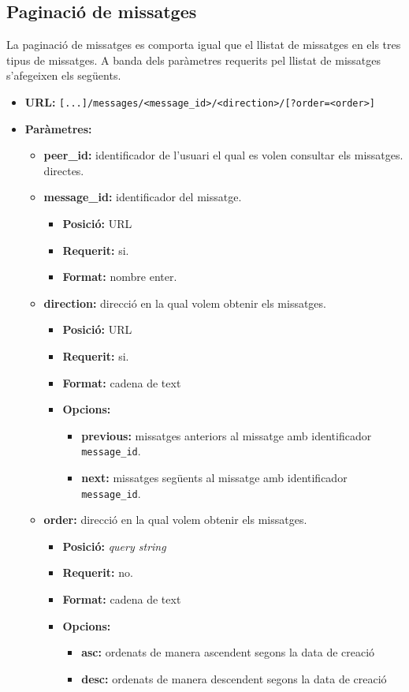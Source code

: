 	
\subsection{Paginació de missatges}
La paginació de missatges es comporta igual que el llistat de missatges en els tres tipus de missatges. A banda dels paràmetres requerits pel llistat de missatges s'afegeixen els següents.
\begin{itemize}
\item \textbf{\ac{URL}:} \verb$[...]/messages/<message_id>/<direction>/[?order=<order>]$
\item \textbf{Paràmetres:}
	\begin{itemize}
		\item \textbf{peer\_id:} identificador de l'usuari el qual es volen consultar els missatges. directes.
		\item \textbf{message\_id:} identificador del missatge.
		\begin{itemize}
			\item \textbf{Posició:} \ac{URL}
			\item \textbf{Requerit:} si.
			\item \textbf{Format:} nombre enter.
		\end{itemize}
		\item \textbf{direction:} direcció en la qual volem obtenir els missatges.
		\begin{itemize}
			\item \textbf{Posició:} \ac{URL}
			\item \textbf{Requerit:} si.
			\item \textbf{Format:} cadena de text
			\item \textbf{Opcions:}
				\begin{itemize}
					\item \textbf{previous:} missatges anteriors al missatge amb identificador \texttt{message\_id}.
					\item \textbf{next:} missatges següents al missatge amb identificador \texttt{message\_id}.
				\end{itemize}
				

		\end{itemize}
		\item \textbf{order:} direcció en la qual volem obtenir els missatges.
		\begin{itemize}
			\item \textbf{Posició:} \emph{query string}
			\item \textbf{Requerit:} no.
			\item \textbf{Format:} cadena de text
			\item \textbf{Opcions:}
				\begin{itemize}
					\item \textbf{asc:} ordenats de manera ascendent segons la data de creació
					\item \textbf{desc:} ordenats de manera descendent segons la data de creació
				\end{itemize}
		\end{itemize}
	\end{itemize}
\end{itemize}


